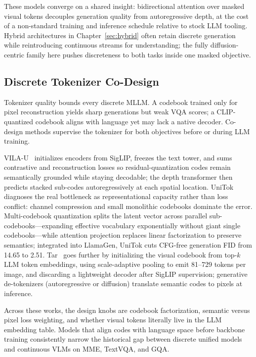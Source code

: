 These models converge on a shared insight: bidirectional attention over masked visual tokens decouples generation quality from autoregressive depth, at the cost of a non-standard training and inference schedule relative to stock LLM tooling. Hybrid architectures in Chapter~\ref{sec:hybrid} often retain discrete generation while reintroducing continuous streams for understanding; the fully diffusion-centric family here pushes discreteness to both tasks inside one masked objective.

\subsection{Discrete Tokenizer Co-Design}
\label{subsec:tokenizer-codesign}

Tokenizer quality bounds every discrete MLLM. A codebook trained only for pixel reconstruction yields sharp generations but weak VQA scores; a CLIP-quantized codebook aligns with language yet may lack a native decoder. Co-design methods supervise the tokenizer for both objectives before or during LLM training.

VILA-U~\cite{wu2025vila} initializes encoders from SigLIP, freezes the text tower, and sums contrastive and reconstruction losses so residual-quantization codes remain semantically grounded while staying decodable; the depth transformer then predicts stacked sub-codes autoregressively at each spatial location. UniTok~\cite{ma2026unitok} diagnoses the real bottleneck as representational capacity rather than loss conflict: channel compression and small monolithic codebooks dominate the error. Multi-codebook quantization splits the latent vector across parallel sub-codebooks---expanding effective vocabulary exponentially without giant single codebooks---while attention projection replaces linear factorization to preserve semantics; integrated into LlamaGen, UniTok cuts CFG-free generation FID from 14.65 to 2.51. Tar~\cite{han2026vision} goes further by initializing the visual codebook from top-$k$ LLM token embeddings, using scale-adaptive pooling to emit 81--729 tokens per image, and discarding a lightweight decoder after SigLIP supervision; generative de-tokenizers (autoregressive or diffusion) translate semantic codes to pixels at inference.

Across these works, the design knobs are codebook factorization, semantic versus pixel loss weighting, and whether visual tokens literally live in the LLM embedding table. Models that align codes with language space before backbone training consistently narrow the historical gap between discrete unified models and continuous VLMs on MME, TextVQA, and GQA.

